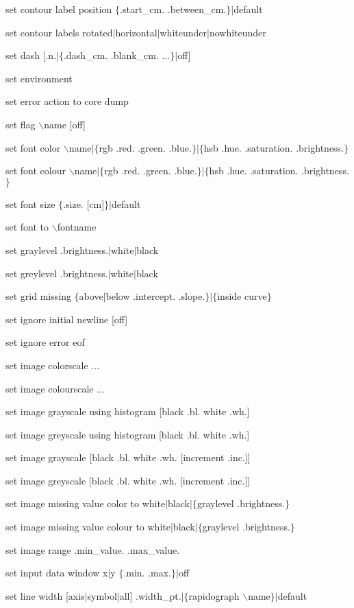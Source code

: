 set contour label position $\lbrace$.start\_cm. .between\_cm.$\rbrace$$\mid$default

set contour labels rotated$\mid$horizontal$\mid$whiteunder$\mid$nowhiteunder

set dash [.n.$\mid$$\lbrace$.dash\_cm. .blank\_cm. ...$\rbrace$$\mid$off]

set environment

set error action to core dump

set flag $\backslash$name [off]

set font color $\backslash$name$\mid$$\lbrace$rgb .red. .green. .blue.$\rbrace$$\mid$$\lbrace$hsb .hue. .saturation. .brightness.$\rbrace$

set font colour $\backslash$name$\mid$$\lbrace$rgb .red. .green. .blue.$\rbrace$$\mid$$\lbrace$hsb .hue. .saturation. .brightness.$\rbrace$

set font size $\lbrace$.size. [cm]$\rbrace$$\mid$default

set font to $\backslash$fontname

set graylevel .brightness.$\mid$white$\mid$black

set greylevel .brightness.$\mid$white$\mid$black

set grid missing $\lbrace$above$\mid$below .intercept. .slope.$\rbrace$$\mid$$\lbrace$inside curve$\rbrace$

set ignore initial newline [off]

set ignore error eof

set image colorscale ...

set image colourscale ...

set image grayscale using histogram [black .bl. white .wh.]

set image greyscale using histogram [black .bl. white .wh.]

set image grayscale [black .bl. white .wh. [increment .inc.]]

set image greyscale [black .bl. white .wh. [increment .inc.]]

set image missing value color to white$\mid$black$\mid$$\lbrace$graylevel .brightness.$\rbrace$

set image missing value colour to white$\mid$black$\mid$$\lbrace$graylevel .brightness.$\rbrace$

set image range .min\_value. .max\_value.

set input data window x$\mid$y $\lbrace$.min. .max.$\rbrace$$\mid$off

set line width [axis$\mid$symbol$\mid$all] .width\_pt.$\mid$$\lbrace$rapidograph $\backslash$name$\rbrace$$\mid$default

